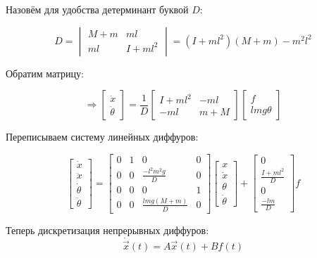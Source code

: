 \documentclass{article}
\begin{document}
Назовём для удобства детерминант буквой $D$:

$$
D = \begin{vmatrix}M+m & ml \\ ml & I+ml^2\end{vmatrix} = (I+ml^2)(M+m) - m^2l^2
$$

Обратим матрицу:

$$
\Rightarrow\begin{bmatrix}\ddot{x}\\ \ddot{\theta}\end{bmatrix} = \frac{1}{D}\begin{bmatrix}I+ml^2 & -ml \\ -ml & m+M\end{bmatrix}\begin{bmatrix}f\\ lmg\theta\end{bmatrix}
$$


Переписываем систему линейных диффуров:

$$
\begin{bmatrix}\dot{x}\\\ddot{x}\\\dot{\theta}\\\ddot{\theta}\end{bmatrix} = 
\begin{bmatrix}
0 & 1 & 0 & 0\\
0 & 0 & \frac{-l^2m^2g}{D} & 0 \\ 
0 & 0 & 0 & 1\\
0 & 0 & \frac{lmg(M+m)}{D} & 0
\end{bmatrix}
\begin{bmatrix}{x}\\\dot{x}\\{\theta}\\\dot{\theta}\end{bmatrix}  +
\begin{bmatrix} 0 \\ \frac{I+ml^2}{D} \\ 0 \\ \frac{-lm}{D} \end{bmatrix} f
$$


Теперь дискретизация непрерывных диффуров:
$$
\dot{\vec{x}}(t) = A \vec{x}(t) + Bf(t)
$$
\end{document}
